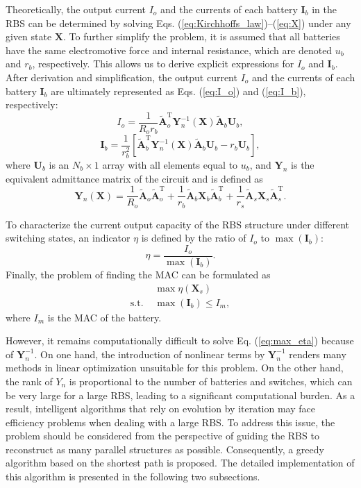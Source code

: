 \documentclass{article}
\def\T{\mathrm{T}}
\begin{document}
Theoretically, the output current $I_o$ and the currents of each battery $\bm{I}_b$ in the RBS  can be determined by solving Eqs. (\ref{eq:Kirchhoffs_law})--(\ref{eq:X}) under any given state $\bm{X}$.
To further simplify the problem, it is assumed that all batteries have the same electromotive force and internal resistance, which are denoted $u_b$ and $r_b$, respectively.
This allows us to derive explicit expressions for $I_o$ and $\bm{I}_b$.
After derivation and simplification, the output current $I_o$ and the currents of each battery $\bm{I}_b$ are ultimately represented as Eqs. (\ref{eq:I_o}) and (\ref{eq:I_b}), respectively:
\begin{equation}\label{eq:I_o}
    I_o = \frac{1}{R_o r_b} \bm{\tilde{A}}_o^\T \bm{Y}_n^{-1}(\bm{X}) \bm{\tilde{A}}_b \bm{U}_b,
\end{equation}
\begin{equation}\label{eq:I_b}
    \bm{I}_b = \frac{1}{r_b^2}[\bm{\tilde{A}}_b^\T \bm{Y}_n^{-1}(\bm{X}) \bm{\tilde{A}}_b\bm{U}_b -r_b \bm{U}_b],
\end{equation}
where $\bm{U}_b$ is an $N_b\times 1$ array with all elements equal to $u_b$,
and $\bm{Y}_n$ is the equivalent admittance matrix of the circuit and is defined as
\begin{equation}\label{eq:Yn}
    \bm{Y}_n (\bm{X}) = \frac{1}{R_o} \bm{\tilde{A}}_o\bm{\tilde{A}}_o^\T + \frac{1}{r_b} \bm{\tilde{A}}_b\bm{X}_b\bm{\tilde{A}}_b^\T + \frac{1}{r_s}\bm{\tilde{A}}_s\bm{X}_s\bm{\tilde{A}}_s^\T.
\end{equation}


To characterize the current output capacity of the RBS structure under different switching states, an indicator $\eta$ is defined by the ratio of $I_o$ to $\max (\bm{I}_b)$:
\begin{equation}\label{eq:eta}
    \eta = \frac{I_o}{\max (\bm{I}_b)}.
\end{equation}
Finally, the problem of finding the MAC can be formulated as
\begin{align}
    & \max \eta(\bm{X}_s) \label{eq:max_eta}\\
    \text{s.t. } & \max (\bm{I}_b) \leq I_m, \label{eq:Ib_leq_Im}
\end{align}
where $I_m$ is the MAC of the battery.


However, it remains computationally difficult to solve Eq. (\ref{eq:max_eta}) because of $\bm{Y}_n^{-1}$.
On one hand,  the introduction of nonlinear terms by $\bm{Y}_n^{-1}$ renders many  methods in linear optimization unsuitable for this problem.
On the other hand, the rank of $Y_{n}$ is proportional to the number of batteries and switches, which can be very large for a large RBS, leading to a significant computational burden.
As a result, intelligent algorithms that rely on evolution by iteration may face efficiency problems when dealing with a large RBS.
To address this issue, the problem should be considered from the perspective of guiding the RBS to reconstruct as many parallel structures as possible.
Consequently, a greedy algorithm based on the shortest path is proposed. 
The detailed implementation of this algorithm is presented in the following two subsections.
\end{document}
